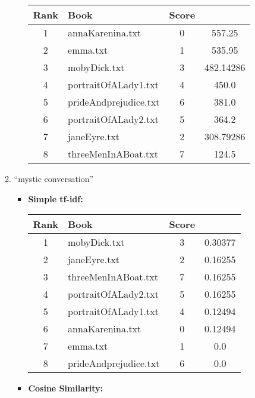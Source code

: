 \documentclass[a4paper,11pt,oneside]{book}
\begin{document}
\begin{enumerate}
\begin{enumerate}
\begin{itemize}
										\begin{tabular}{clcc}
											\toprule
												\textbf{Rank} & \textbf{Book} & \textbf{Score}\\
											\hline
												1	&	annaKarenina.txt	&	0	&	557.25	\\
												2	&	emma.txt	&	1	&	535.95	\\
												3	&	mobyDick.txt	&	3	&	482.14286	\\
												4	&	portraitOfALady1.txt	&	4	&	450.0	\\
												5	&	prideAndprejudice.txt	&	6	&	381.0	\\
												6	&	portraitOfALady2.txt	&	5	&	364.2	\\
												7	&	janeEyre.txt	&	2	&	308.79286	\\
												8	&	threeMenInABoat.txt	&	7	&	124.5	\\
											\bottomrule
										\end{tabular}\newline
						\end{itemize}
						
			\item ``mystic conversation''
						\begin{itemize}
							\item \textbf{Simple tf-idf:}
							
										\begin{tabular}{clcc}
											\toprule
												\textbf{Rank} & \textbf{Book} & \textbf{Score}\\
											\hline
												1	&	mobyDick.txt	&	3	&	0.30377	\\
												2	&	janeEyre.txt	&	2	&	0.16255	\\
												3	&	threeMenInABoat.txt	&	7	&	0.16255	\\
												4	&	portraitOfALady2.txt	&	5	&	0.16255	\\
												5	&	portraitOfALady1.txt	&	4	&	0.12494	\\
												6	&	annaKarenina.txt	&	0	&	0.12494	\\
												7	&	emma.txt	&	1	&	0.0	\\
												8	&	prideAndprejudice.txt	&	6	&	0.0	\\
											\bottomrule
										\end{tabular}\newline
							\item \textbf{Cosine Similarity:}
							

\end{itemize}
\end{enumerate}
\end{enumerate}
\end{document}
